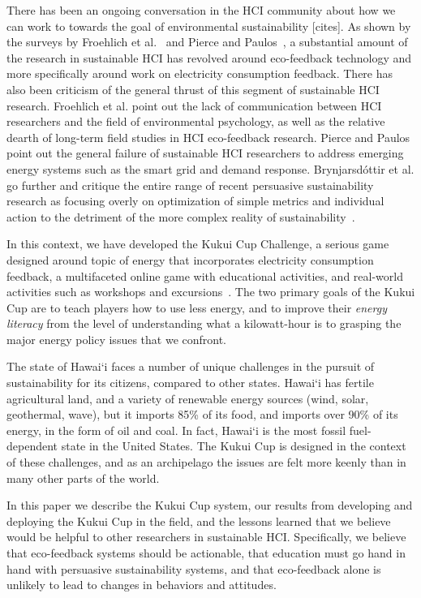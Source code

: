 \documentclass{sigchi}
\begin{document}
There has been an ongoing conversation in the HCI community about how we can work to towards the goal of environmental sustainability [cites]. As shown by the surveys by Froehlich et al.~\cite{Froehlich2010} and Pierce and Paulos~\cite{Pierce2012-BEM}, a substantial amount of the research in sustainable HCI has revolved around eco-feedback technology and more specifically around work on electricity consumption feedback. There has also been criticism of the general thrust of this segment of sustainable HCI research. Froehlich et al. point out the lack of communication between HCI researchers and the field of environmental psychology, as well as the relative dearth of long-term field studies in HCI eco-feedback research. Pierce and Paulos point out the general failure of sustainable HCI researchers to address emerging energy systems such as the smart grid and demand response. Brynjarsd\'{o}ttir et al. go further and critique the entire range of recent persuasive sustainability research as focusing overly on optimization of simple metrics and individual action to the detriment of the more complex reality of sustainability~\cite{Brynjarsdottir2012-unpersuaded}.

In this context, we have developed the Kukui Cup Challenge, a serious game~\cite{Zyda2005} designed around topic of energy that incorporates electricity consumption feedback, a multifaceted online game with educational activities, and real-world activities such as workshops and excursions~\cite{csdl2-10-07}. The two primary goals of the Kukui Cup are to teach players how to use less energy, and to improve their \emph{energy literacy} from the level of understanding what a kilowatt-hour is to grasping the major energy policy issues that we confront.

The state of Hawai`i faces a number of unique challenges in the pursuit of sustainability for its citizens, compared to other states. Hawai`i has fertile 
agricultural land, and a variety of renewable energy sources (wind, solar, geothermal, wave), but it imports 85\% of its food, and imports over 90\% of its energy, in the form of oil and coal. In fact, Hawai`i is the most fossil fuel-dependent state in the United States. The Kukui Cup is designed in the context of these challenges, and as an archipelago the issues are felt more keenly than in many other parts of the world.

In this paper we describe the Kukui Cup system, our results from developing and deploying the Kukui Cup in the field, and the lessons learned that we believe would be helpful to other researchers in sustainable HCI. Specifically, we believe that eco-feedback systems should be actionable, that education must go hand in hand with persuasive sustainability systems, and that eco-feedback alone is unlikely to lead to changes in behaviors and attitudes.
\end{document}
